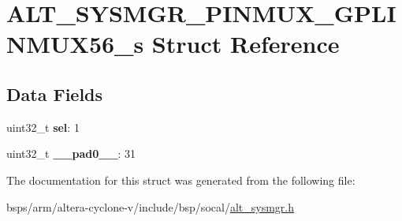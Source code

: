 \hypertarget{structALT__SYSMGR__PINMUX__GPLINMUX56__s}{}\section{A\+L\+T\+\_\+\+S\+Y\+S\+M\+G\+R\+\_\+\+P\+I\+N\+M\+U\+X\+\_\+\+G\+P\+L\+I\+N\+M\+U\+X56\+\_\+s Struct Reference}
\label{structALT__SYSMGR__PINMUX__GPLINMUX56__s}
\subsection*{Data Fields}
\begin{DoxyCompactItemize}
\item 
\mbox{\label{structALT__SYSMGR__PINMUX__GPLINMUX56__s_a4ac77ebad708edd01f321dc934782141}} 
uint32\+\_\+t {\bfseries sel}\+: 1
\item 
\mbox{\label{structALT__SYSMGR__PINMUX__GPLINMUX56__s_a7dbb3c7e51056a83ad0c0a5bacd09ce7}} 
uint32\+\_\+t {\bfseries \+\_\+\+\_\+pad0\+\_\+\+\_\+}\+: 31
\end{DoxyCompactItemize}


The documentation for this struct was generated from the following file\+:\begin{DoxyCompactItemize}
\item 
bsps/arm/altera-\/cyclone-\/v/include/bsp/socal/\mbox{\hyperlink{alt__sysmgr_8h}{alt\+\_\+sysmgr.\+h}}\end{DoxyCompactItemize}
